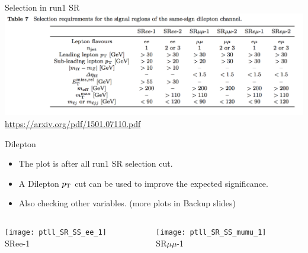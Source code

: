 \documentclass[mathserif,serif]{beamer}
\begin{document}
\begin{frame}{Selection in run1 SR}
\includegraphics[width=\textwidth]{data/photo/SRcutrun1.png} \\
\url{https://arxiv.org/pdf/1501.07110.pdf}
\end{frame}

\begin{frame}{Dilepton \pt}
\begin{itemize}
\item The plot is after all run1 SR selection cut.
\item A Dilepton $p_{\text{T}}$ cut can be used to improve the expected significance.
\item Also checking other variables. (more plots in Backup slides)
\end{itemize}

\begin{columns}

\begin{column}{0.5\textwidth}
\begin{center}
\texttt{[image: ptll\_SR\_SS\_ee\_1]} \\
SRee-1
\end{center}
\end{column}

\begin{column}{0.5\textwidth}
\begin{center}
\texttt{[image: ptll\_SR\_SS\_mumu\_1]} \\
SR$\mu\mu$-1
\end{center}
\end{column}

\end{columns}

\end{frame}
\end{document}

